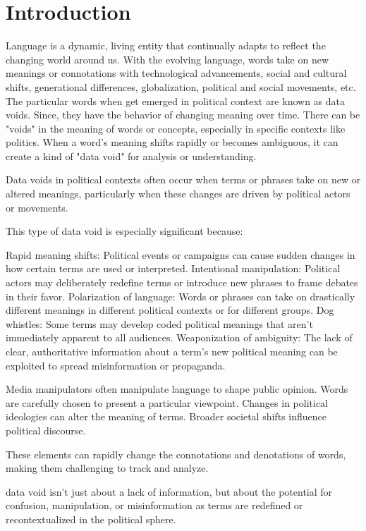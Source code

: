 
\section{Introduction} \label{sec:introduction}
Language is a dynamic, living entity that continually adapts to reflect the changing world around us.
With the evolving language, words take on new meanings or connotations with technological advancements,
social and cultural shifts, generational differences, globalization, political and social movements, etc.
The particular words when get emerged in political context are known as data voids.
Since, they have the behavior of changing meaning over time.
There can be "voids" in the meaning of words or concepts, especially in specific contexts like politics.
When a word's meaning shifts rapidly or becomes ambiguous, it can create a kind of "data void" for analysis or understanding.

Data voids in political contexts often occur when terms or phrases take on new or altered meanings,
particularly when these changes are driven by political actors or movements.

This type of data void is especially significant because:

Rapid meaning shifts: Political events or campaigns can cause sudden changes in how certain terms are used or interpreted.
Intentional manipulation: Political actors may deliberately redefine terms or introduce new phrases to frame debates in their favor.
Polarization of language: Words or phrases can take on drastically different meanings in different political contexts or for different groups.
Dog whistles: Some terms may develop coded political meanings that aren't immediately apparent to all audiences.
Weaponization of ambiguity: The lack of clear, authoritative information about a term's new political meaning can be exploited to spread misinformation or propaganda.

Media manipulators often manipulate language to shape public opinion.
Words are carefully chosen to present a particular viewpoint.
Changes in political ideologies can alter the meaning of terms.
Broader societal shifts influence political discourse.

These elements can rapidly change the connotations and denotations of words, making them challenging to track and analyze.

data void isn't just about a lack of information, but about the potential for confusion, manipulation, or misinformation as terms are redefined or recontextualized in the political sphere.

